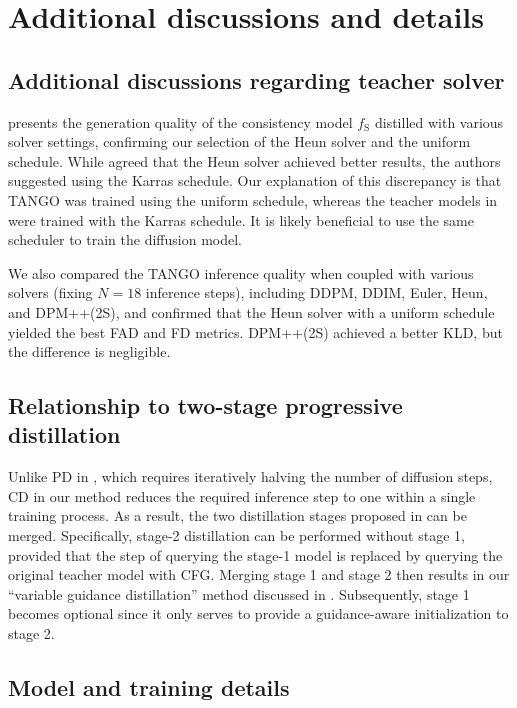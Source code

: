 \documentclass{article}
\newcommand{\fstu}{f_{\mathrm{S}}}
\begin{document}
\section{Additional discussions and details} \label{sec:exp_details}

\subsection{Additional discussions regarding teacher solver} \label{sec:solver_discuss}

 presents the generation quality of the consistency model $\fstu$ distilled with various solver settings, confirming our selection of the Heun solver and the uniform schedule. While \cite{cm} agreed that the Heun solver achieved better results, the authors suggested using the Karras schedule. Our explanation of this discrepancy is that TANGO was trained using the uniform schedule, whereas the teacher models in \cite{cm} were trained with the Karras schedule. It is likely beneficial to use the same scheduler to train the diffusion model.

We also compared the TANGO inference quality when coupled with various solvers (fixing $N = 18$ inference steps), including DDPM, DDIM, Euler, Heun, and DPM++(2S), and confirmed that the Heun solver with a uniform schedule yielded the best FAD and FD metrics. DPM++(2S) achieved a better KLD, but the difference is negligible.


\subsection{Relationship to two-stage progressive distillation} \label{sec:twostage_details}

Unlike PD in \cite{distillcfg}, which requires iteratively halving the number of diffusion steps, CD in our method reduces the required inference step to one within a single training process. As a result, the two distillation stages proposed in \cite{distillcfg} can be merged. Specifically, stage-2 distillation can be performed without stage 1, provided that the step of querying the stage-1 model is replaced by querying the original teacher model with CFG. Merging stage 1 and stage 2 then results in our ``variable guidance distillation'' method discussed in . Subsequently, stage 1 becomes optional since it only serves to provide a guidance-aware initialization to stage 2.


\subsection{Model and training details} \label{sec:model_details}
\end{document}
